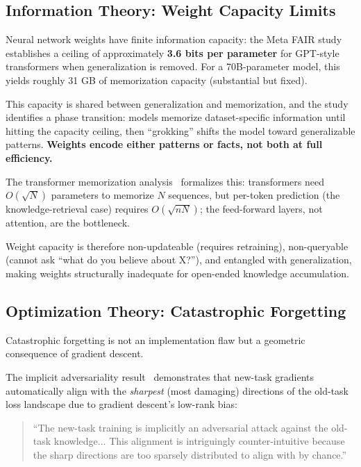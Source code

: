 \documentclass[11pt,letterpaper]{article}
\begin{document}
\subsection{Information Theory: Weight Capacity Limits}

Neural network weights have finite information capacity: the Meta FAIR study~\cite{metafair2026} establishes a ceiling of approximately \textbf{3.6 bits per parameter} for GPT-style transformers when generalization is removed. For a 70B-parameter model, this yields roughly 31 GB of memorization capacity (substantial but fixed).

This capacity is shared between generalization and memorization, and the study identifies a phase transition: models memorize dataset-specific information until hitting the capacity ceiling, then ``grokking'' shifts the model toward generalizable patterns. \textbf{Weights encode either patterns or facts, not both at full efficiency.}

The transformer memorization analysis~\cite{transformermem2025} formalizes this: transformers need $O(\sqrt{N})$ parameters to memorize $N$ sequences, but per-token prediction (the knowledge-retrieval case) requires $O(\sqrt{nN})$; the feed-forward layers, not attention, are the bottleneck.

Weight capacity is therefore non-updateable (requires retraining), non-queryable (cannot ask ``what do you believe about X?''), and entangled with generalization, making weights structurally inadequate for open-ended knowledge accumulation.

\subsection{Optimization Theory: Catastrophic Forgetting}

Catastrophic forgetting is not an implementation flaw but a geometric consequence of gradient descent.

The implicit adversariality result~\cite{adversarial2025} demonstrates that new-task gradients automatically align with the \textit{sharpest} (most damaging) directions of the old-task loss landscape due to gradient descent's low-rank bias:

\begin{quote}
``The new-task training is implicitly an adversarial attack against the old-task knowledge... This alignment is intriguingly counter-intuitive because the sharp directions are too sparsely distributed to align with by chance.''
\end{quote}
\end{document}

